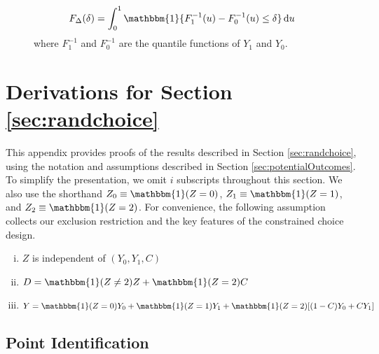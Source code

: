 \begin{figure}[H]
    \[F_\Delta(\delta) = \int_0^1 \mathbbm{1}\{ F_1^{-1}(u) - F_0^{-1}(u)\leq \delta\}\,\mathrm{d}u\]
where $F_1^{-1}$ and $F_0^{-1}$ are the quantile functions of $Y_1$ and $Y_0$.
\end{figure}



\newpage



\section{Derivations for Section \ref{sec:randchoice}}
\label{append:randchoice}


This appendix provides proofs of the results described in Section \ref{sec:randchoice}, using the notation and assumptions described in Section \ref{sec:potentialOutcomes}. 
To simplify the presentation, we omit $i$ subscripts throughout this section.
We also use the shorthand $Z_0 \equiv \mathbbm{1}(Z=0)$, $Z_1 \equiv \mathbbm{1}(Z=1)$, and $Z_2 \equiv\mathbbm{1}(Z=2)$.
For convenience, the following assumption collects our exclusion restriction and the key features of the constrained choice design.

\begin{assumption}\mbox{}
\label{assump:randchoice}
   \begin{enumerate}[(i)]
   \item $Z$ is independent of $(Y_{0}, Y_{1}, C)$
   \item $D = \mathbbm{1}(Z \neq 2)Z + \mathbbm{1}(Z = 2)C$
   \item $Y = \mathbbm{1}(Z = 0) Y_{0} + \mathbbm{1}(Z = 1) Y_{1} + \mathbbm{1}(Z = 2) [ (1 - C) Y_{0} + C Y_{1}]$
   \end{enumerate}
\end{assumption}


\subsection{Point Identification}

